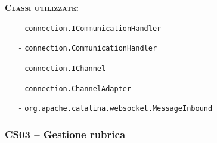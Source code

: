 \begin{description}
	\item{\scshape\bfseries Classi utilizzate:}
	\begin{itemize}[nolistsep, noitemsep]
	  \item[-] \texttt{connection.ICommunicationHandler}
	  \item[-] \texttt{connection.CommunicationHandler}
	  \item[-] \texttt{connection.IChannel}
	  \item[-] \texttt{connection.ChannelAdapter}
	  \item[-] \texttt{org.apache.catalina.websocket.MessageInbound}
	\end{itemize}
\end{description}

\subsubsection{CS03 -- Gestione rubrica}
